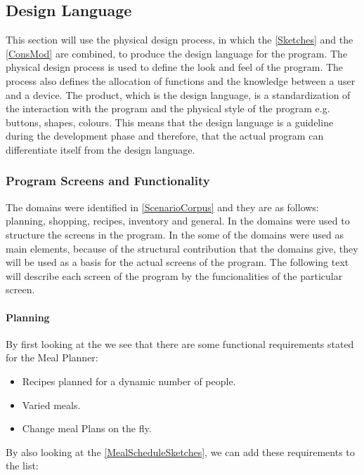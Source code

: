 \subsection{Design Language}
This section will use the physical design process, in which the  \cref{Sketches} and the  \cref{ConsMod} are combined, to produce the design language for the program. The physical design process is used to define the look and feel of the program. The process also defines the allocation of functions and the knowledge between a user and a device. The product, which is the design language, is a standardization of the interaction with the program and the physical style of the program e.g. buttons, shapes, colours. This means that the design language is a guideline during the development phase and therefore, that the actual program can differentiate itself from the design language.

\subsubsection{Program Screens and Functionality} \label{ScreensandFunctionality}
The domains were identified in \cref{ScenarioCorpus} and they are as follows: planning, shopping, recipes, inventory and general. In  the domains were used to structure the screens in the program. In the  some of the domains were used as main elements, because of the structural contribution that the domains give, they will be used as a basis for the actual screens of the program. The following text will describe each screen of the program by the funcionalities of the particular screen.

\paragraph{Planning}
By first looking at the  we see that there are some functional requirements stated for the Meal Planner:

\begin{itemize}
\item Recipes planned for a dynamic number of people.
\item Varied meals.
\item Change meal Plans on the fly.
\end{itemize}  

By also looking at the  \cref{MealScheduleSketches}, we can add these requirements to the list:

